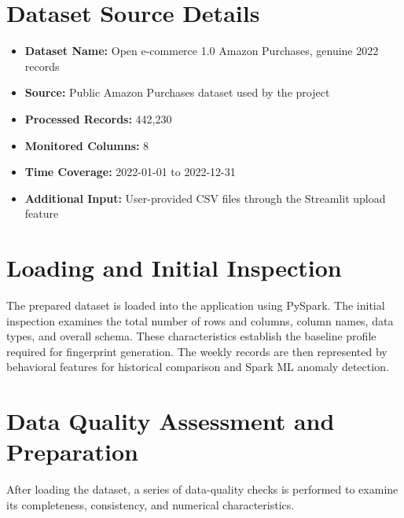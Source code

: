 \documentclass[12pt,a4paper]{report}
\begin{document}
\section{Dataset Source Details}

\begin{itemize}
    \item \textbf{Dataset Name:} Open e-commerce 1.0 Amazon Purchases, genuine 2022 records
    \item \textbf{Source:} Public Amazon Purchases dataset used by the project
    \item \textbf{Processed Records:} 442,230
    \item \textbf{Monitored Columns:} 8
    \item \textbf{Time Coverage:} 2022-01-01 to 2022-12-31
    \item \textbf{Additional Input:} User-provided CSV files through the Streamlit upload feature
\end{itemize}

\section{Loading and Initial Inspection}

The prepared dataset is loaded into the application using PySpark. The initial inspection examines the total number of rows and columns, column names, data types, and overall schema. These characteristics establish the baseline profile required for fingerprint generation. The weekly records are then represented by behavioral features for historical comparison and Spark ML anomaly detection.

\section{Data Quality Assessment and Preparation}

After loading the dataset, a series of data-quality checks is performed to examine its completeness, consistency, and numerical characteristics.
\end{document}
